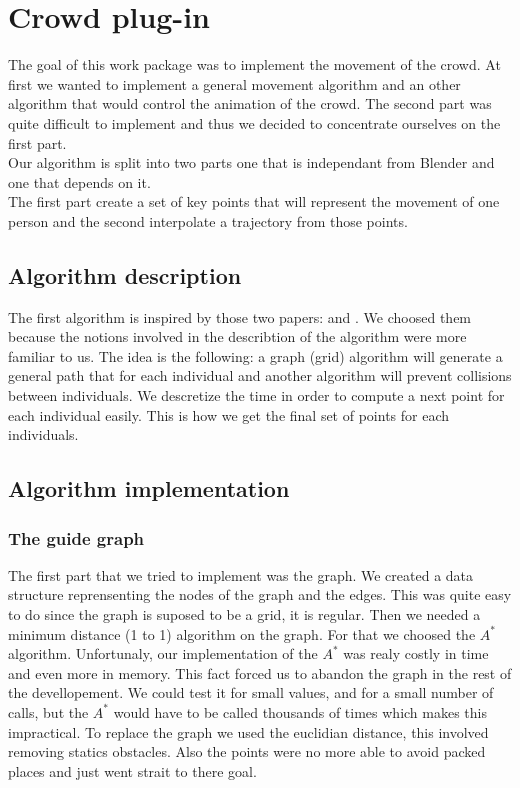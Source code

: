 \section{Crowd plug-in}

The goal of this work package was to implement the movement of the crowd. At first we wanted to implement a general movement algorithm and an other algorithm that would control the animation of the crowd. The second part was quite difficult to implement and thus we decided to concentrate ourselves on the first part.\\
Our algorithm is split into two parts one that is independant from Blender and one that depends on it. \\
The first part create a set of key points that will represent the movement of one person and the second interpolate a trajectory from those points.

\subsection{Algorithm description}

The first algorithm is inspired by those two papers: \cite{PLE} and \cite{vandenBerg2011}. We choosed them because the notions involved in the describtion of the algorithm were more familiar to us.
The idea is the following: a graph (grid) algorithm will generate a general path that for each individual and another algorithm will prevent collisions between individuals. We descretize the time in order to compute a next point for each individual easily. This is how we get the final set of points for each individuals.

\subsection{Algorithm implementation}

\subsubsection{The guide graph}

The first part that we tried to implement was the graph. We created a data structure reprensenting the nodes of the graph and the edges. This was quite easy to do since the graph is suposed to be a grid, it is regular.
Then we needed a minimum distance (1 to 1) algorithm on the graph. For that we choosed the $A^*$ algorithm. Unfortunaly, our implementation of the $A^*$ was realy costly in time and even more in memory. This fact forced us to abandon the graph in the rest of the devellopement. We could test it for small values, and for a small number of calls, but the $A^*$ would have to be called thousands of times which makes this impractical. 
To replace the graph we used the euclidian distance, this involved removing statics obstacles. Also the points were no more able to avoid packed places and just went strait to there goal.

